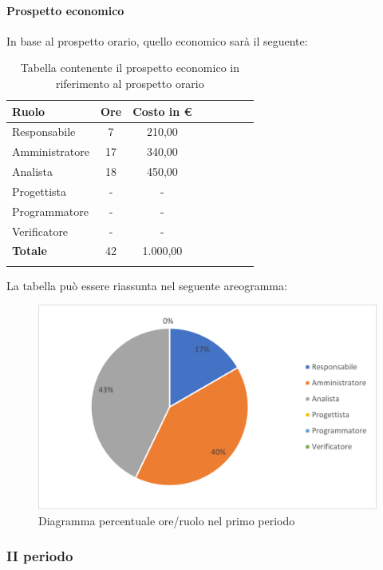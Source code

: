 			\paragraph{Prospetto economico}
			In base al prospetto orario, quello economico sarà il seguente: 
			
			\begin{longtable}{|l|c|c|c|c|c|c|c|}
				\hline
				\rowcolor{lighter-grayer}
				\textbf{Ruolo} & \textbf{Ore} & \textbf{Costo in €} \\
				\hline
				\endfirsthead
				
				\hline
				Responsabile & 7 & 210,00\\
				\hline
				\hline
				Amministratore & 17 & 340,00\\
				\hline
				\hline
				Analista & 18 & 450,00\\
				\hline
				\hline
				Progettista & - & -\\
				\hline
				\hline
				Programmatore & - & -\\
				\hline
				\hline
				Verificatore & - & -\\
				\hline
				\textbf{Totale} & 42 & 1.000,00\\
				\hline
				\rowcolor{white}
				\caption{Tabella contenente il prospetto economico in riferimento al prospetto orario}
			\end{longtable}
			\pagebreak
		
			La tabella può essere riassunta nel seguente areogramma:
			\begin{figure}[H]
				\centering
				\includegraphics[width=0.8\linewidth]{res/images/preventivo/dettaglio_analisi/1-2.png}
				\caption{Diagramma percentuale ore/ruolo nel primo periodo}
				\label{fig:diagramma costi ruolo  primo periodo analisi}
            \end{figure}

	\subsubsection{II periodo}
